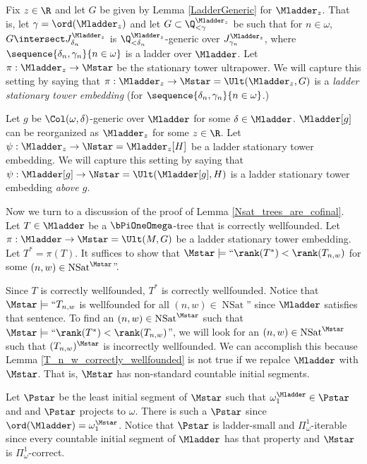 \documentclass[oneside,12pt]{amsart}
\DeclareMathOperator{\NSat}{NSat}
\begin{document}
\begin{definition}
\label{LadderStationaryTowerEmbedding}
Fix $z\in\R$ and let $G$ be given by Lemma \ref{LadderGeneric} for $\Mladder_z$. That is,
let $\gamma=\ord(\Mladder_z)$ and let $G\subset \Q_{<\gamma}^{\Mladder_z}$ be such that for
$n\in\omega$, $G\intersect J^{\Mladder_z}_{\delta_n}$ is
$\Q_{<\delta_n}^{\Mladder_z}$-generic over $J^{\Mladder_z}_{\gamma_n}$, where
$\sequence{\delta_n,\gamma_n}{n\in\omega}$ is a ladder over $\Mladder$.
Let $\pi:\Mladder_z\to\Mstar$ be the stationary tower ultrapower.
We will capture this setting by saying that  $\pi:\Mladder_z\to\Mstar=\Ult(\Mladder_z,G)$
is a \emph{ladder stationary tower embedding} (for $\sequence{\delta_n,\gamma_n}{n\in\omega}$.)

Let $g$ be $\Col(\omega,\delta)$-generic over $\Mladder$ for some
$\delta\in\Mladder$.
$\Mladder[g]$ can be reorganized as $\Mladder_z$ for some $z\in\R$.
Let $\psi:\Mladder_z\to\Nstar=\Mladder_z[H]$ be a ladder stationary tower embedding.
We will capture this setting by saying that
$\psi:\Mladder[g]\to\Nstar=\Ult(\Mladder[g],H)$ is a ladder stationary tower embedding \emph{above $g$}.
\end{definition}

Now we turn to a discussion of the proof of Lemma \ref{Nsat_trees_are_cofinal}.
Let $T\in\Mladder$ be a $\bPiOneOmega$-tree that is correctly wellfounded.
Let $\pi:\Mladder\to\Mstar=\Ult(M,G)$ be a ladder stationary tower embedding.
Let $T^* = \pi(T)$. It suffices to show that
$\Mstar\models\text{``}\rank(T^*) < \rank(T_{n,w})$ for some $(n,w)\in \NSat^{\Mstar}$''.

Since $T$ is correctly wellfounded, $T^*$ is correctly wellfounded.
Notice that $\Mstar\models\text{``}T_{n,w}$ is wellfounded for all $(n,w)\in \NSat$''
since $\Mladder$ satisfies that sentence. To find an $(n,w)\in \NSat^{\Mstar}$ such that
$\Mstar\models\text{``}\rank(T^*) < \rank(T_{n,w})$'', we will look for an
$(n,w)\in \NSat^{\Mstar}$
such that $(T_{n,w})^{\Mstar}$ is incorrectly wellfounded.
We can accomplish this because Lemma \ref{T_n_w_correctly_wellfounded} is not
true if we repalce $\Mladder$ with $\Mstar$. That is, $\Mstar$ has non-standard
countable initial segments.

Let $\Pstar$ be the least initial segment of $\Mstar$ such that
$\omega_1^{\Mladder}\in\Pstar$ and
and $\Pstar$ projects to $\omega$. There is such a $\Pstar$ since
$\ord(\Mladder)=\omega_1^{\Mstar}$. Notice that $\Pstar$ is ladder-small and
$\Pi^1_{\omega}$-iterable since every countable initial segment of $\Mladder$
has that property and $\Mstar$ is $\Pi^1_{\omega}$-correct.
\end{document}
